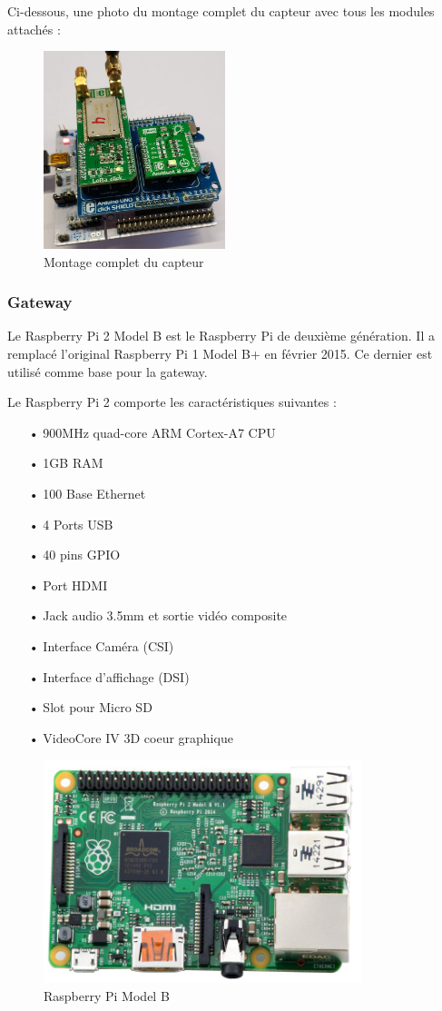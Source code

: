 \documentclass[12pt]{article}
\begin{document}
Ci-dessous, une photo du montage complet du capteur avec tous les modules attachés :
\begin{figure}[!h]
	\centering
	\includegraphics[width=200px]{montage}
	\caption{Montage complet du capteur}
	\label{}
\end{figure}

\newpage
\subsubsection{Gateway}

Le Raspberry Pi 2 Model B est le Raspberry Pi de deuxième génération. Il a remplacé l'original Raspberry Pi 1 Model B+ en février 2015. Ce dernier est utilisé comme base pour la gateway.

Le Raspberry Pi 2 comporte les caractéristiques suivantes :

\begin{itemize}
	\item[•] 900MHz quad-core ARM Cortex-A7 CPU
	\item[•] 1GB RAM
	\item[•] 100 Base Ethernet
	\item[•] 4 Ports USB
	\item[•] 40 pins GPIO
	\item[•] Port HDMI
	\item[•] Jack audio 3.5mm et sortie vidéo composite
	\item[•] Interface Caméra (CSI)
	\item[•] Interface d'affichage (DSI)
	\item[•] Slot pour Micro SD
	\item[•] VideoCore IV 3D coeur graphique
\end{itemize}



\begin{figure}[!h]
	\centering
	\includegraphics[width=350px]{raspberry}
	\caption{Raspberry Pi Model B}
	\label{raspberry}
\end{figure}
\end{document}

